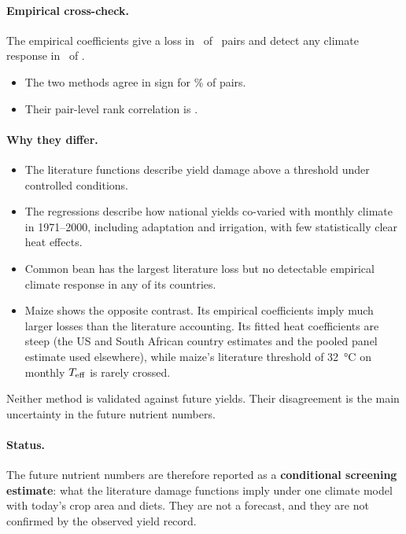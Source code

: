 \paragraph{Empirical cross-check.} The empirical coefficients give a loss in \fyEmpNeg\ of \fyN\ pairs and
detect any climate response in \fyEmpDetected\ of \fyN.
\begin{itemize}
\item The two methods agree in sign for \fySameSign\% of pairs.
\item Their pair-level rank correlation is \corrLitEmp.
\end{itemize}

\paragraph{Why they differ.}
\begin{itemize}
\item The literature functions describe yield damage above a threshold under controlled conditions.
\item The regressions describe how national yields co-varied with monthly climate in 1971--2000, including
adaptation and irrigation, with few statistically clear heat effects.
\item Common bean has the largest literature loss but no detectable empirical climate response in any of its
countries.
\item Maize shows the opposite contrast. Its empirical coefficients imply much larger losses than the literature
accounting. Its fitted heat coefficients are steep (the US and South African country estimates and the pooled
panel estimate used elsewhere), while maize's literature threshold of \SI{32}{\celsius} on monthly $T_{\mathrm{eff}}$ is
rarely crossed.
\end{itemize}
Neither method is validated against future yields. Their disagreement is the main uncertainty in the future
nutrient numbers.

\paragraph{Status.} The future nutrient numbers are therefore reported as a \textbf{conditional screening
estimate}: what the literature damage functions imply under one climate model with today's crop area and diets.
They are not a forecast, and they are not confirmed by the observed yield record.

\begin{table}[H]\centering\small\caption{Conditional climate-driven yield change by crop, 1971--2000 $\to$
2041--2060 (literature accounting and empirical cross-check).}\label{tab:futyield}
\end{table}
